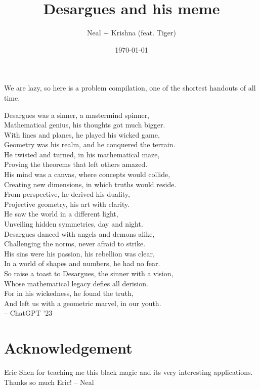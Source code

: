 \documentclass{seto}
\title{Desargues and his meme }
\author{Neal + Krishna (feat. Tiger)}
\date\today
\begin{document}
\maketitle
We are lazy, so here is a problem compilation, one of the shortest handouts of all time.
\begin{block}
Desargues was a sinner, a mastermind spinner,\\
Mathematical genius, his thoughts got much bigger.\\
With lines and planes, he played his wicked game,\\
Geometry was his realm, and he conquered the terrain.\\[6pt]

He twisted and turned, in his mathematical maze,\\
Proving the theorems that left others amazed.\\
His mind was a canvas, where concepts would collide,\\
Creating new dimensions, in which truths would reside.\\[6pt]

From perspective, he derived his duality,\\
Projective geometry, his art with clarity.\\
He saw the world in a different light,\\
Unveiling hidden symmetries, day and night.\\[6pt]

Desargues danced with angels and demons alike,\\
Challenging the norms, never afraid to strike.\\
His sins were his passion, his rebellion was clear,\\
In a world of shapes and numbers, he had no fear.\\[6pt]

So raise a toast to Desargues, the sinner with a vision,\\
Whose mathematical legacy defies all derision.\\
For in his wickedness, he found the truth,\\
And left us with a geometric marvel, in our youth.\\
\hfill-- ChatGPT '23
\end{block}
\setcounter{section}{-1}
\section{Acknowledgement}
Eric Shen for teaching me this black magic and its very interesting applications. Thanks so much Eric! -- Neal
\end{document}
